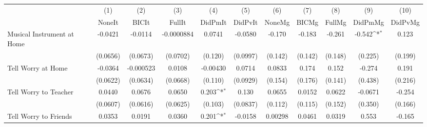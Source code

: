 {
\def\sym#1{\ifmmode^{#1}\else\(^{#1}\)\fi}
\begin{tabular}{l*{10}{c}}
\toprule
            &\multicolumn{1}{c}{(1)}&\multicolumn{1}{c}{(2)}&\multicolumn{1}{c}{(3)}&\multicolumn{1}{c}{(4)}&\multicolumn{1}{c}{(5)}&\multicolumn{1}{c}{(6)}&\multicolumn{1}{c}{(7)}&\multicolumn{1}{c}{(8)}&\multicolumn{1}{c}{(9)}&\multicolumn{1}{c}{(10)}\\
            &\multicolumn{1}{c}{NoneIt}&\multicolumn{1}{c}{BICIt}&\multicolumn{1}{c}{FullIt}&\multicolumn{1}{c}{DidPmIt}&\multicolumn{1}{c}{DidPvIt}&\multicolumn{1}{c}{NoneMg}&\multicolumn{1}{c}{BICMg}&\multicolumn{1}{c}{FullMg}&\multicolumn{1}{c}{DidPmMg}&\multicolumn{1}{c}{DidPvMg}\\
\midrule
Musical Instrument at Home&     -0.0421         &     -0.0114         &  -0.0000884         &      0.0741         &     -0.0580         &      -0.170         &      -0.183         &      -0.261         &      -0.542\sym{*}  &       0.123         \\
            &    (0.0656)         &    (0.0673)         &    (0.0702)         &     (0.120)         &    (0.0997)         &     (0.142)         &     (0.142)         &     (0.148)         &     (0.225)         &     (0.199)         \\
\addlinespace
Tell Worry at Home&     -0.0364         &   -0.000523         &      0.0108         &    -0.00430         &      0.0714         &      0.0833         &       0.174         &       0.152         &      -0.274         &       0.191         \\
            &    (0.0622)         &    (0.0634)         &    (0.0668)         &     (0.110)         &    (0.0929)         &     (0.154)         &     (0.176)         &     (0.141)         &     (0.438)         &     (0.216)         \\
\addlinespace
Tell Worry to Teacher&      0.0440         &      0.0676         &      0.0650         &       0.203\sym{*}  &       0.130         &      0.0655         &      0.0152         &      0.0622         &     -0.0671         &      -0.254         \\
            &    (0.0607)         &    (0.0616)         &    (0.0625)         &     (0.103)         &    (0.0837)         &     (0.112)         &     (0.115)         &     (0.152)         &     (0.350)         &     (0.166)         \\
\addlinespace
Tell Worry to Friends&      0.0353         &      0.0191         &      0.0360         &       0.201\sym{*}  &     -0.0158         &     0.00298         &      0.0461         &      0.0319         &       0.553         &      -0.165         \\

\end{tabular}}
